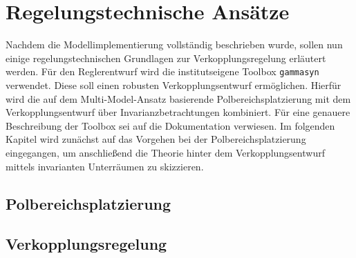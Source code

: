 \chapter{Regelungstechnische Ansätze}\label{cha:GrundlagenReg}
Nachdem die Modellimplementierung vollständig beschrieben wurde, sollen nun einige regelungstechnischen Grundlagen zur Verkopplungsregelung erläutert werden. Für den Reglerentwurf wird die institutseigene Toolbox \texttt{gammasyn} verwendet. Diese soll einen robusten Verkopplungsentwurf ermöglichen. Hierfür wird die auf dem Multi-Model-Ansatz basierende Polbereichsplatzierung mit dem Verkopplungsentwurf über Invarianzbetrachtungen kombiniert. Für eine genauere Beschreibung der Toolbox sei auf die Dokumentation verwiesen\cite{Vogt, gammaDoku}.
Im folgenden Kapitel wird zunächst auf das Vorgehen bei der Polbereichsplatzierung eingegangen, um anschließend die Theorie hinter dem Verkopplungsentwurf mittels invarianten Unterräumen zu skizzieren.

\section{Polbereichsplatzierung}\label{sec:PBV}


\section{Verkopplungsregelung}\label{sec:Verkopplung}


